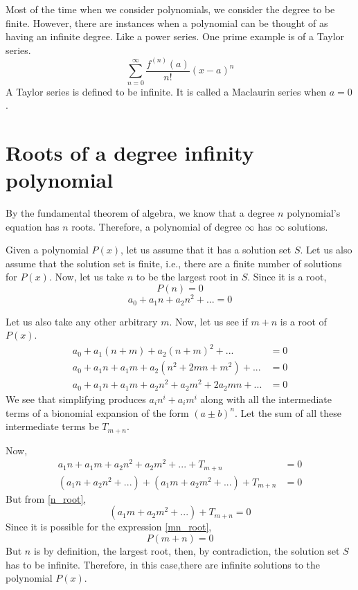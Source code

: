 \documentclass[preprint,12pt]{elsarticle}
\begin{document}
Most of the time when we consider polynomials, we consider the degree to be finite.
However, there are instances when a polynomial can be thought of as having an infinite degree. Like a power series.
One prime example is of a Taylor series.\cite{1137203}
\[
    \sum_{n = 0}^{\infty} \frac{f^{(n)} (a)}{n!} (x-a)^n
\]
A Taylor series is defined to be infinite.
It is called a Maclaurin series when $a = 0$.
\label{S:2}
\section{Roots of a degree infinity polynomial}
By the fundamental theorem of algebra, we know that a degree $n$ polynomial's equation has $n$ roots.
Therefore, a polynomial of degree $\infty$ has $\infty$ solutions.

Given a polynomial $P(x)$, let us assume that it has a solution set $S$.
Let us also assume that the solution set is finite, i.e., there are a finite number of solutions for $P(x)$.
Now, let us take $n$ to be the largest root in $S$.
Since it is a root, 
\[
    P(n) = 0
\]
\begin{equation} \label{n_root}
     a_0 + a_1n + a_2n^2 + ... = 0
\end{equation}
   
Let us also take any other arbitrary $m$.
Now, let us see if $m + n$ is a root of $P(x)$.
\begin{align*}
    a_0 + a_1(n + m) + a_2(n + m)^2 + ... &= 0\\
    a_0 + a_1n + a_1m + a_2(n^2 + 2mn + m^2) + ... &= 0\\
    a_0 + a_1n + a_1m + a_2n^2 + a_2m^2 + 2a_2mn + ... &= 0
\end{align*}
We see that simplifying produces $a_in^i + a_im^i$ along with all the intermediate terms of a bionomial expansion of the form $(a \pm b)^n$.
Let the sum of all these intermediate terms be $T_{m + n}$.

Now, 
\begin{align*}
    a_1n + a_1m + a_2n^2 + a_2m^2 + ... + T_{m+n} &= 0\\
    (a_1n + a_2n^2 + ...) + (a_1m + a_2m^2 + ...) + T_{m+n} &= 0
\end{align*}
But from \ref{n_root}, 
\begin{equation} \label{mn_root}
    (a_1m + a_2m^2 + ...) + T_{m+n} = 0
\end{equation}
Since it is possible for the expression \ref{mn_root}, 
\[P(m+n)=0\]
But $n$ is by definition, the largest root, then, by contradiction, the solution set $S$ has to be infinite.
Therefore, in this case,there are infinite solutions to the polynomial $P(x)$.
\end{document}
